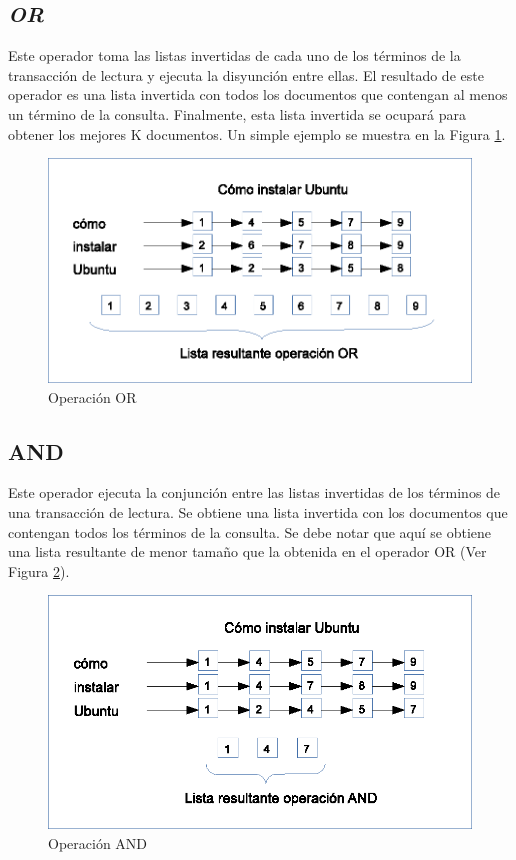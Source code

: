 \subsection{\textit{OR}}
\label{marco:or}
Este operador toma las listas invertidas de cada uno de los términos de la transacción de lectura y ejecuta la disyunción entre ellas. El resultado de este operador es una lista invertida con todos los documentos que contengan al menos un término de la consulta. Finalmente, esta lista invertida se ocupará para obtener los mejores K documentos. Un simple ejemplo se muestra en la Figura \ref{fig:ORoperation}.

\begin{figure}[!th]
\centering
\includegraphics[scale=.75]{images/ORoperation.eps}
\caption{Operaci\'on OR}
\label{fig:ORoperation}
\end{figure}

\subsection{AND}
\label{marco:and}
Este operador ejecuta la conjunción entre las listas invertidas de los términos de una transacción de lectura. Se obtiene una lista invertida con los documentos que contengan todos los términos de la consulta. Se debe notar que aquí se obtiene una lista resultante de menor tamaño que la obtenida en el operador OR (Ver Figura \ref{fig:ANDoperation}).

\begin{figure}[!th]
\centering
\includegraphics[scale=.75]{images/ANDoperation.eps}
\caption{Operaci\'on AND}
\label{fig:ANDoperation}
\end{figure}

